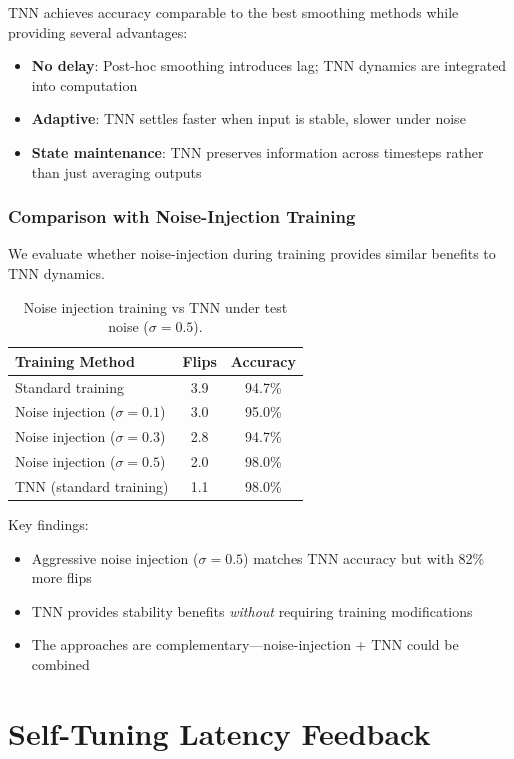 \documentclass[11pt]{article}
\begin{document}
TNN achieves accuracy comparable to the best smoothing methods while providing several advantages:
\begin{itemize}
    \item \textbf{No delay}: Post-hoc smoothing introduces lag; TNN dynamics are integrated into computation
    \item \textbf{Adaptive}: TNN settles faster when input is stable, slower under noise
    \item \textbf{State maintenance}: TNN preserves information across timesteps rather than just averaging outputs
\end{itemize}

\subsubsection{Comparison with Noise-Injection Training}

We evaluate whether noise-injection during training provides similar benefits to TNN dynamics.

\begin{table}[h]
\centering
\begin{tabular}{lcc}
\toprule
Training Method & Flips & Accuracy \\
\midrule
Standard training & 3.9 & 94.7\% \\
Noise injection ($\sigma=0.1$) & 3.0 & 95.0\% \\
Noise injection ($\sigma=0.3$) & 2.8 & 94.7\% \\
Noise injection ($\sigma=0.5$) & 2.0 & 98.0\% \\
\midrule
TNN (standard training) & 1.1 & 98.0\% \\
\bottomrule
\end{tabular}
\caption{Noise injection training vs TNN under test noise ($\sigma=0.5$).}
\label{tab:noise_injection}
\end{table}

Key findings:
\begin{itemize}
    \item Aggressive noise injection ($\sigma=0.5$) matches TNN accuracy but with 82\% more flips
    \item TNN provides stability benefits \emph{without} requiring training modifications
    \item The approaches are complementary---noise-injection + TNN could be combined
\end{itemize}

\section{Self-Tuning Latency Feedback}
\label{sec:selftuning}
\end{document}
